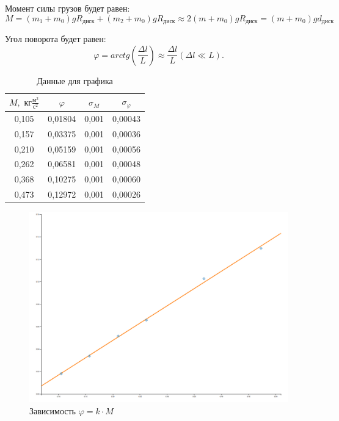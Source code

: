 \documentclass[a4paper, 12pt]{article}
\begin{document}
\begin{center}
    \bigskip

    Момент силы грузов будет равен:
    \begin{equation}
        M = (m_{1}+m_{0})gR_{\text{диск}} + (m_{2}+m_{0})gR_{\text{диск}} \approx 2(m+m_{0})gR_{\text{диск}} = (m+m_{0})gd_{\text{диск}}
    \end{equation}

    Угол поворота будет равен:
    \begin{equation}
        \varphi = arctg(\frac{\Delta l}{L}) \approx \frac{\Delta l}{L} (\Delta l \ll L).
    \end{equation}
    
    \end{center}

    \newpage

    \begin{table}[h!]
    \begin{center}
        \begin{tabular}{|c|c|c|c|}
        \hline \hline
        $ M, \text{ кг}\frac{\text{м}^2}{\text{с}^2}$ & $ \varphi $ & $\sigma_{M}$ & $\sigma_{\varphi}$ \\ \hline \hline
        0,105 & 0,01804 & 0,001 & 0,00043 \\ \hline
        0,157 & 0,03375 & 0,001 & 0,00036 \\ \hline
        0,210 & 0,05159 & 0,001 & 0,00056 \\ \hline
        0,262 & 0,06581 & 0,001 & 0,00048 \\ \hline
        0,368 & 0,10275 & 0,001 & 0,00060 \\ \hline
        0,473 & 0,12972 & 0,001 & 0,00026 \\ \hline \hline
        \end{tabular}
    \caption{Данные для графика}
    \end{center}
    \end{table}

    \begin{figure}[H]
        \centering
        \includegraphics[scale = 0.4, angle=90]{graph1.png}
        \caption{Зависимость $\varphi = k \cdot M$}
    \end{figure}
\end{document}
